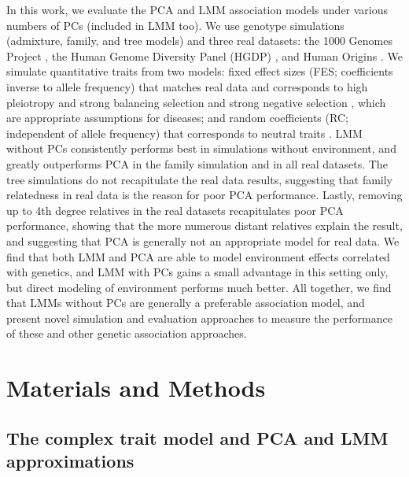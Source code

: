 \documentclass[11pt]{article}
\begin{document}
\begin{linenumbers}
In this work, we evaluate the PCA and LMM association models under various numbers of PCs (included in LMM too).
We use genotype simulations (admixture, family, and tree models) and three real datasets: the 1000 Genomes Project \citep{the_1000_genomes_project_consortium_map_2010, 1000_genomes_project_consortium_integrated_2012}, the Human Genome Diversity Panel (HGDP) \citep{cann_human_2002, rosenberg_genetic_2002, bergstrom_insights_2020}, and Human Origins \citep{patterson_ancient_2012, lazaridis_ancient_2014, lazaridis_genomic_2016, skoglund_genomic_2016}.
We simulate quantitative traits from two models: fixed effect sizes (FES; coefficients inverse to allele frequency) that matches real data \citep{park_distribution_2011, zeng_signatures_2018, oconnor_extreme_2019} and corresponds to high pleiotropy and strong balancing selection \citep{simons_population_2018} and strong negative selection \citep{zeng_signatures_2018, oconnor_extreme_2019}, which are appropriate assumptions for diseases; and random coefficients (RC; independent of allele frequency) that corresponds to neutral traits \citep{zeng_signatures_2018, simons_population_2018}.
LMM without PCs consistently performs best in simulations without environment, and greatly outperforms PCA in the family simulation and in all real datasets.
The tree simulations do not recapitulate the real data results, suggesting that family relatedness in real data is the reason for poor PCA performance.
Lastly, removing up to 4th degree relatives in the real datasets recapitulates poor PCA performance, showing that the more numerous distant relatives explain the result, and suggesting that PCA is generally not an appropriate model for real data.
We find that both LMM and PCA are able to model environment effects correlated with genetics, and LMM with PCs gains a small advantage in this setting only, but direct modeling of environment performs much better.
All together, we find that LMMs without PCs are generally a preferable association model, and present novel simulation and evaluation approaches to measure the performance of these and other genetic association approaches.

\section{Materials and Methods}

\subsection{The complex trait model and PCA and LMM approximations}


\end{linenumbers}
\end{document}
